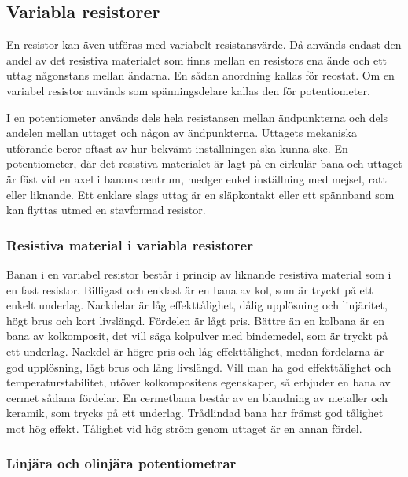 \subsection{Variabla resistorer}

En resistor kan även utföras med variabelt resistansvärde. Då används endast
den andel av det resistiva materialet som finns mellan en resistors ena ände
och ett uttag någonstans mellan ändarna. En sådan anordning kallas för reostat.
Om en variabel resistor används som spänningsdelare kallas den för
potentiometer.

I en potentiometer används dels hela resistansen mellan ändpunkterna och dels
andelen mellan uttaget och någon av ändpunkterna. Uttagets mekaniska utförande
beror oftast av hur bekvämt inställningen ska kunna ske. En potentiometer,
där det resistiva materialet är lagt på en cirkulär bana och uttaget är fäst
vid en axel i banans centrum, medger enkel inställning med mejsel, ratt eller liknande.
Ett enklare slags uttag är en släpkontakt eller ett spännband som kan flyttas
utmed en stavformad resistor.

\subsubsection{Resistiva material i variabla resistorer}

Banan i en variabel resistor består i princip av liknande resistiva material
som i en fast resistor. Billigast och enklast är en bana av kol, som är tryckt
på ett enkelt underlag. Nackdelar är låg effekttålighet, dålig upplösning och
linjäritet, högt brus och kort livslängd. Fördelen är lågt pris.
Bättre än en kolbana är en bana av kolkomposit, det vill säga kolpulver med 
bindemedel, som är tryckt på ett underlag. Nackdel är högre pris och låg 
effekttålighet, medan fördelarna är god upplösning, lågt brus och lång livslängd.
Vill man ha god effekttålighet och temperaturstabilitet, utöver kolkompositens
egenskaper, så erbjuder en bana av cermet sådana fördelar. En cermetbana består
av en blandning av metaller och keramik, som trycks på ett underlag.
Trådlindad bana har främst god tålighet mot hög effekt. Tålighet vid hög ström
genom uttaget är en annan fördel.

\subsubsection{Linjära och olinjära potentiometrar}

